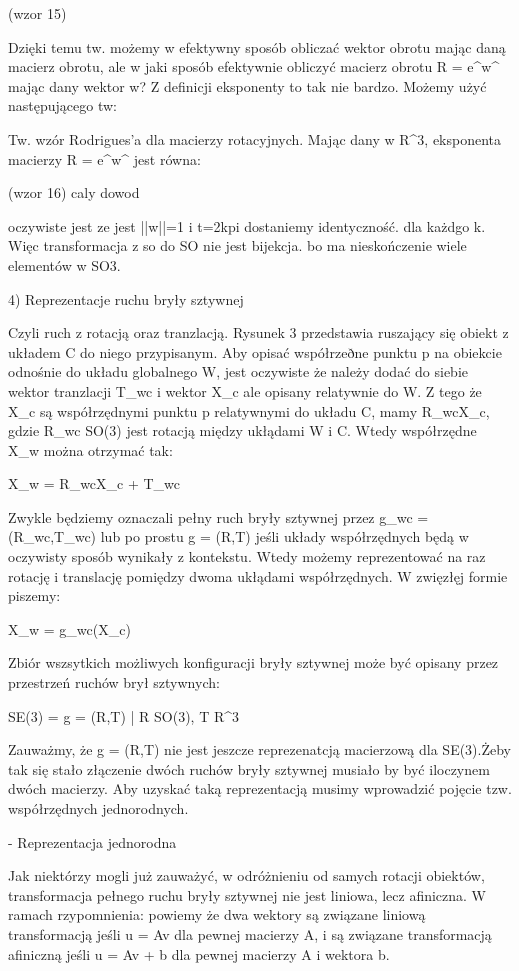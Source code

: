 (wzor 15)

Dzięki temu tw. możemy w efektywny sposób obliczać wektor obrotu mając daną macierz obrotu, ale w jaki sposób efektywnie obliczyć macierz obrotu R = e^w^ mając dany wektor w? Z definicji eksponenty to tak nie bardzo. Możemy użyć następującego tw:

Tw. wzór Rodrigues'a dla macierzy rotacyjnych. Mając dany w \in R^3, eksponenta macierzy R = e^w^ jest równa:

(wzor 16) caly dowod

oczywiste jest ze jest ||w||=1 i t=2kpi dostaniemy identyczność. dla każdgo k. Więc transformacja z so do SO nie jest bijekcja. bo ma nieskończenie wiele elementów w SO3.

4) Reprezentacje ruchu bryły sztywnej

Czyli ruch z rotacją oraz tranzlacją. Rysunek 3 przedstawia ruszający się obiekt z układem C do niego przypisanym. Aby opisać współrzeðne punktu p na obiekcie odnośnie do układu globalnego W, jest oczywiste że należy dodać do siebie wektor tranzlacji T_wc i wektor X_c ale opisany relatywnie do W. Z tego że X_c są współrzędnymi punktu p relatywnymi do układu C, mamy R_wcX_c, gdzie R_wc \in SO(3) jest rotacją między ukłądami W i C. Wtedy współrzędne X_w można otrzymać tak:

X_w = R_wcX_c + T_wc

Zwykle będziemy oznaczali pełny ruch bryły sztywnej przez g_wc = (R_wc,T_wc) lub po prostu g = (R,T) jeśli układy współrzędnych będą w oczywisty sposób wynikały z kontekstu. Wtedy możemy reprezentować na raz rotację i translację pomiędzy dwoma ukłądami współrzędnych. W zwięzłęj formie piszemy:

X_w = g_wc(X_c)

Zbiór wszsytkich możliwych konfiguracji bryły sztywnej może być opisany przez przestrzeń ruchów brył sztywnych:

SE(3) = {g = (R,T) | R \in SO(3), T \in R^3}

Zauważmy, że g = (R,T) nie jest jeszcze  reprezenatcją macierzową dla SE(3).Żeby tak się stało złączenie dwóch ruchów bryły sztywnej musiało by być iloczynem dwóch macierzy. Aby uzyskać taką reprezentacją musimy wprowadzić pojęcie tzw. współrzędnych jednorodnych.

- Reprezentacja jednorodna

Jak niektórzy mogli już zauważyć, w odróżnieniu od samych rotacji obiektów, transformacja pełnego ruchu bryły sztywnej nie jest liniowa, lecz afiniczna. W ramach rzypomnienia: powiemy że dwa wektory są związane liniową transformacją jeśli u = Av dla pewnej macierzy A, i są związane transformacją afiniczną jeśli u = Av + b dla pewnej macierzy A i wektora b.

